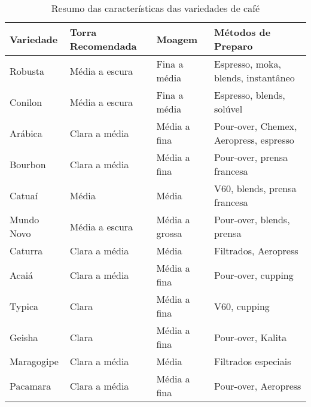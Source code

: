 \documentclass[a4paper,12pt]{article}
\begin{document}
\begin{table}[h!]
\centering
\caption{Resumo das características das variedades de café}
\begin{tabular}{|>{\raggedright\arraybackslash}p{3.5cm}|>{\raggedright\arraybackslash}p{2.5cm}|>{\raggedright\arraybackslash}p{2.5cm}|>{\raggedright\arraybackslash}p{4cm}|}
\hline
\textbf{Variedade} & \textbf{Torra Recomendada} & \textbf{Moagem} & \textbf{Métodos de Preparo} \\
\hline
Robusta & Média a escura & Fina a média & Espresso, moka, blends, instantâneo \\
\hline
Conilon & Média a escura & Fina a média & Espresso, blends, solúvel \\
\hline
Arábica & Clara a média & Média a fina & Pour-over, Chemex, Aeropress, espresso \\
\hline
Bourbon & Clara a média & Média a fina & Pour-over, prensa francesa \\
\hline
Catuaí & Média & Média & V60, blends, prensa francesa \\
\hline
Mundo Novo & Média a escura & Média a grossa & Pour-over, blends, prensa \\
\hline
Caturra & Clara a média & Média & Filtrados, Aeropress \\
\hline
Acaiá & Clara a média & Média a fina & Pour-over, cupping \\
\hline
Typica & Clara & Média a fina & V60, cupping \\
\hline
Geisha & Clara & Média a fina & Pour-over, Kalita \\
\hline
Maragogipe & Clara a média & Média & Filtrados especiais \\
\hline
Pacamara & Clara a média & Média a fina & Pour-over, Aeropress \\
\hline
\end{tabular}
\end{table}




\end{document}
